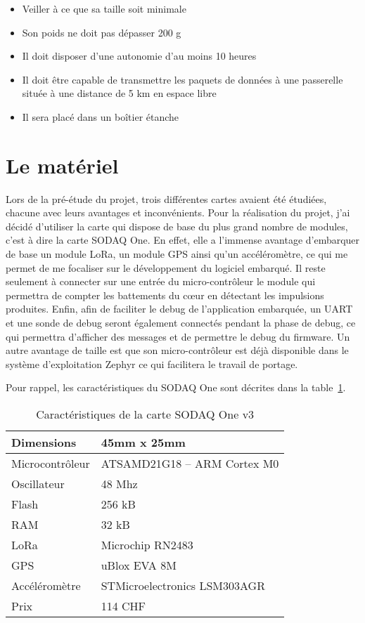 \begin{itemize}
\item Veiller à ce que sa taille soit minimale
\item Son poids ne doit pas dépasser 200 g
\item Il doit disposer d'une autonomie d'au moins 10 heures
\item Il doit être capable de transmettre les paquets de données à une passerelle située à une distance de 5 km en espace libre
\item Il sera placé dans un boîtier étanche
\end{itemize}

\section{Le matériel}

Lors de la pré-étude du projet, trois différentes cartes avaient été étudiées, chacune avec leurs avantages et inconvénients. Pour la réalisation du projet, j'ai décidé d'utiliser la carte qui dispose de base du plus grand nombre de modules, c'est à dire la carte SODAQ One. En effet, elle a l'immense avantage d'embarquer de base un module LoRa, un module GPS ainsi qu'un accéléromètre, ce qui me permet de me focaliser sur le développement du logiciel embarqué. Il reste seulement à connecter sur une entrée du micro-contrôleur le module qui permettra de compter les battements du cœur en détectant les impulsions produites. Enfin, afin de faciliter le debug de l'application embarquée, un UART et une sonde de debug seront également connectés pendant la phase de debug, ce qui permettra d'afficher des messages et de permettre le debug du firmware. Un autre avantage de taille est que son micro-contrôleur est déjà disponible dans le système d'exploitation Zephyr ce qui facilitera le travail de portage.

Pour rappel, les caractéristiques du SODAQ One sont décrites dans la table~\ref{tab:sodaq_one_cara}.

\begin{table}[htb]
\caption[Caractéristiques de la carte SODAQ One v3]{Caractéristiques de la carte SODAQ One v3}
\label{tab:sodaq_one_cara}
\centering
\begin{tabular}{ l | l }
\toprule
Dimensions & 45mm x 25mm \\
\midrule
Microcontrôleur & ATSAMD21G18 – ARM Cortex M0 \\
\midrule
Oscillateur & 48 Mhz \\
\midrule
Flash & 256 kB \\
\midrule
RAM & 32 kB \\
\midrule
LoRa & Microchip RN2483 \\
\midrule
GPS & uBlox EVA 8M \\
\midrule
Accéléromètre & STMicroelectronics LSM303AGR \\
\midrule
Prix & 114 CHF\\
\bottomrule 
\end{tabular}
\end{table}


